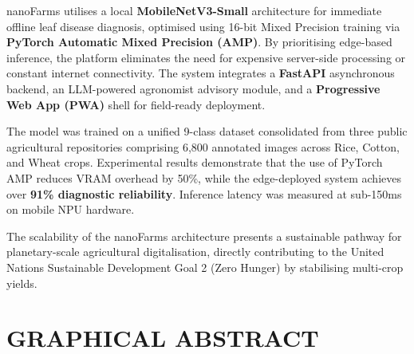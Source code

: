 \documentclass[12pt,oneside]{report}
\begin{document}
nanoFarms utilises a local \textbf{MobileNetV3-Small} architecture for immediate offline leaf disease diagnosis, optimised using 16-bit Mixed Precision training via \textbf{PyTorch Automatic Mixed Precision (AMP)}. By prioritising edge-based inference, the platform eliminates the need for expensive server-side processing or constant internet connectivity. The system integrates a \textbf{FastAPI} asynchronous backend, an LLM-powered agronomist advisory module, and a \textbf{Progressive Web App (PWA)} shell for field-ready deployment.

The model was trained on a unified 9-class dataset consolidated from three public agricultural repositories comprising 6,800 annotated images across Rice, Cotton, and Wheat crops. Experimental results demonstrate that the use of PyTorch AMP reduces VRAM overhead by 50\%, while the edge-deployed system achieves over \textbf{91\% diagnostic reliability}. Inference latency was measured at sub-150ms on mobile NPU hardware.

The scalability of the nanoFarms architecture presents a sustainable pathway for planetary-scale agricultural digitalisation, directly contributing to the United Nations Sustainable Development Goal 2 (Zero Hunger) by stabilising multi-crop yields.

\clearpage

\chapter*{GRAPHICAL ABSTRACT}
\thispagestyle{fancy}
\end{document}
